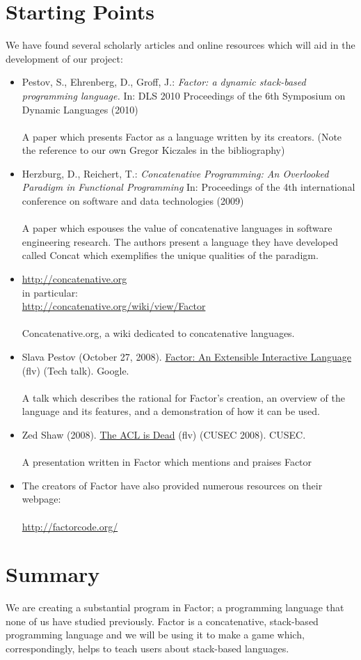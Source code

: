 \documentclass{sig-alternate}
\begin{document}
\section{Starting Points}
We have found several scholarly articles and online resources
which will aid in the development of our project:

\begin{itemize}
\item Pestov, S., Ehrenberg, D., Groff, J.: \textit{Factor: a dynamic stack-based programming
language.} In: DLS 2010 Proceedings of the 6th Symposium on Dynamic Languages
(2010)\\\\A paper which presents Factor as a language written by its creators. (Note the
reference to our own Gregor Kiczales in the bibliography)
\item Herzburg, D., Reichert, T.: \textit{Concatenative Programming:
An Overlooked Paradigm in Functional Programming} In: Proceedings of the 4th
international conference on software and data technologies (2009)
\\\\A paper which espouses the value of concatenative languages in software engineering 
research. The authors present a language they have developed called Concat which exemplifies the unique qualities of the paradigm.
\item \url{http://concatenative.org}\\
in particular:\\\url{http://concatenative.org/wiki/view/Factor}\\\\Concatenative.org, a wiki dedicated to concatenative languages.
\item Slava Pestov (October 27, 2008). \href{http://youtu.be/f_0QlhYlS8g}{Factor: An Extensible Interactive Language} (flv) (Tech talk). Google.\\\\A talk which describes the rational for Factor's creation, an overview of the language and its features, and a demonstration of how it can be used.
\item Zed Shaw (2008). \href{http://vimeo.com/2723800}{The ACL is Dead} (flv) (CUSEC 2008). CUSEC.\\\\
A presentation written in Factor which mentions and praises Factor
\item The creators of Factor have also provided numerous resources on their webpage:\\\\\url{http://factorcode.org/}
\end{itemize}


\section{Summary}
We are creating a substantial program in Factor; a programming language that none of us have studied previously. Factor is a concatenative, stack-based programming language and we will be using it to make a game which, correspondingly, helps to teach users about stack-based languages.


\balancecolumns
\end{document}
